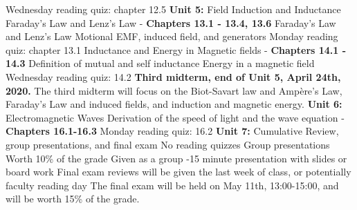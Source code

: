 \documentclass[10pt]{article}
\begin{document}
\begin{outline}[enumerate]
\3 Wednesday reading quiz: chapter 12.5
\1 \textbf{Unit 5:} Field Induction and Inductance
\2 Faraday's Law and Lenz's Law - \textbf{Chapters 13.1 - 13.4, 13.6}
\3 Faraday's Law and Lenz's Law
\3 Motional EMF, induced field, and generators
\3 Monday reading quiz: chapter 13.1
\2 Inductance and Energy in Magnetic fields - \textbf{Chapters 14.1 - 14.3}
\3 Definition of mutual and self inductance
\3 Energy in a magnetic field
\3 Wednesday reading quiz: 14.2
\1 \textbf{Third midterm, end of Unit 5, April 24th, 2020.} The third midterm will focus on the Biot-Savart law and Amp\`{e}re's Law, Faraday's Law and induced fields, and induction and magnetic energy.
\1 \textbf{Unit 6:} Electromagnetic Waves
\2 Derivation of the speed of light and the wave equation - \textbf{Chapters 16.1-16.3}
\2 Monday reading quiz: 16.2
\1 \textbf{Unit 7:} Cumulative Review, group presentations, and final exam
\2 No reading quizzes
\2 Group presentations
\3 Worth 10\% of the grade
\3 Given as a group
-15 minute presentation with slides or board work
\3 Final exam reviews will be given the last week of class, or potentially faculty reading day
\3 The final exam will be held on May 11th, 13:00-15:00, and will be worth 15\% of the grade.
\end{outline}
\end{document}
